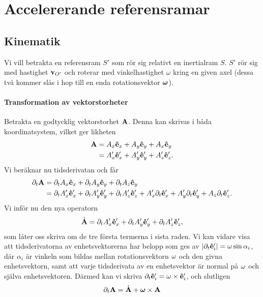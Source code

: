 \section{Accelererande referensramar}

\subsection{Kinematik}

Vi vill betrakta en referensram $S'$ som rör sig relativt en inertialram $S$. $S'$ rör sig med hastighet $\vb{v}_{O'}$ och roterar med vinkelhastighet $\omega$ kring en given axel (dessa två kommer slås i hop till en enda rotationsvektor $\vb*{\omega}$).

\paragraph{Transformation av vektorstorheter}
Betrakta en godtycklig vektorstorhet $\vb{A}$. Denna kan skrivas i båda koordinatsystem, vilket ger likheten
\begin{align*}
	\vb{A} &= A_{x}\vu{e}_{x} + A_{y}\vu{e}_{y} + A_{x}\vu{e}_{y} \\
	       &= A_{x}'\vu{e}_{x}' + A_{y}'\vu{e}_{y}' + A_{z}'\vu{e}_{z}'.
\end{align*}
Vi beräknar nu tidsderivatan och får
\begin{align*}
	\partial_{t}\vb{A} &= \partial_{t}A_{x}\vu{e}_{x} + \partial_{t}A_{y}\vu{e}_{y} + \partial_{t}A_{z}\vu{e}_{y} \\
	       &= \partial_{t}A_{x}'\vu{e}_{x}' + \partial_{t}A_{y}'\vu{e}_{y}' + \partial_{t}A_{z}'\vu{e}_{z}' + A_{x}'\partial_{t}\vu{e}_{x}' + A_{y}'\partial_{t}\vu{e}_{y}' + A_{z}\partial_{t}\vu{e}_{z}'.
\end{align*}
Vi inför nu den nya operatorn
\begin{align*}
	\mathring{\vb{A}} = \partial_{t}A_{x}'\vu{e}_{x}' + \partial_{t}A_{y}'\vu{e}_{y}' + \partial_{t}A_{z}'\vu{e}_{z}',
\end{align*}
som låter oss skriva om de tre första termerna i sista raden. Vi kan vidare visa att tidsderivatorna av enhetsvektorerna har belopp som ges av $\abs{\partial_{t}\vu{e}_{i}'} = \omega\sin{\alpha_i}$, där $\alpha_i$ är vinkeln som bildas mellan rotationsvektorn $\vb{\omega}$ och den givna enhetsvektorn, samt att varje tidsderivata av en enhetsvektor är normal på $\vb{\omega}$ och själva enhetsvektoren. Därmed kan vi skriva $\partial_{t}\vu{e}_{i}' = \vb{\omega}\times\vu{e}_{i}'$, och slutligen
\begin{align}
	\partial_{t}\vb{A} = \mathring{\vb{A}} + \vb*{\omega}\times\vb{A}
	\label{eq:relderiv}
\end{align}

